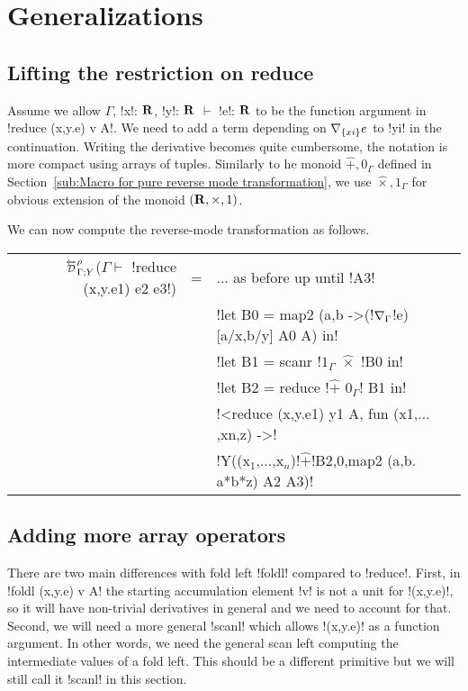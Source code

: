 \section{Generalizations}
\label{sec:generalization}


\subsection{Lifting the restriction on reduce}
\label{sub:Lifting the restriction on reduce}

Assume we allow $\Gamma$, !x!: $\mathbf{R}$, !y!: $\mathbf{R}$ $\vdash$ !e!: $\mathbf{R}$ to be the function argument in
!reduce (x,y.e) v A!. We need to add a term depending on $\nabla_{\{xi\}}e$ to !yi! in the continuation.
Writing the derivative becomes quite cumbersome, the notation is more compact using arrays of tuples. 
Similarly to he monoid $\widehat{+},0_\Gamma$ defined in Section~\ref{sub:Macro for pure reverse mode transformation},
we use $\widehat{\times},1_\Gamma$ for obvious extension of the monoid $(\mathbf{R},\times,1)$.

We can now compute the reverse-mode transformation as follows.
\begin{center}
\begin{tabular}{r c l}
$\directD{\rho}{\Gamma}{Y}$($\Gamma\vdash $ !reduce (x,y.e1) e2 e3!) 
&=& $\ldots$ as before up until !A3! \\
&& !let B0 = map2 (a,b ->(!$\nabla_\Gamma$!e)[a/x,b/y] A0 A) in!\\
&& !let B1 = scanr !$1_\Gamma$ $\widehat{\times}$ !B0 in! \\
&& !let B2 = reduce !$\widehat{+}$ $0_\Gamma$! B1 in! \\
&& !<reduce (x,y.e1) y1 A, fun (x1,$\ldots$,xn,z) ->! \\
&& !Y((x$_1$,$\ldots$,x$_n$)!$\widehat{+}$!B2,0,map2 (a,b. a*b*z) A2 A3)!
\end{tabular}
\end{center}

\subsection{Adding more array operators}
\label{sub:Adding more array operators}

There are two main differences with fold left !foldl! compared to !reduce!. 
First, in !foldl (x,y.e) v A! the starting accumulation element !v! is not a unit for !(x,y.e)!,
so it will have non-trivial derivatives in general and we need to account for that.
Second, we will need a more general !scanl! which allows !(x,y.e)! as a function argument. 
In other words, we need the general scan left computing the intermediate values of a fold left.
This should be a different primitive but we will still call it !scanl! in this section.


